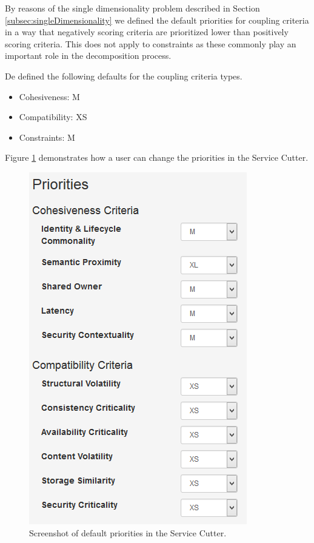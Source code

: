 \begin{minipage}[t]{0.3\textwidth}
\setlength{\parskip}{5pt plus 0.1pt}

By reasons of the single dimensionality problem described in Section \ref{subsec:singleDimensionality} we defined the default priorities for coupling criteria in a way that negatively scoring criteria are prioritized lower than positively scoring criteria. This does not apply to constraints as these commonly play an important role in the decomposition process. 

De defined the following defaults for the coupling criteria types.

\begin{itemize}
\item Cohesiveness: M
\item Compatibility: XS
\item Constraints: M
\end{itemize}

Figure \ref{fig:priorities} demonstrates how a user can change the priorities in the Service Cutter.

\end{minipage}
\begin{minipage}[t]{0.75\textwidth}
	\begin{figure}[H]
		\begin{center}
			\includegraphics[scale=0.6]{images/priorities.png}
			\caption{Screenshot of default priorities in the Service Cutter.}
			\label{fig:priorities}
		\end{center}
	\end{figure}
\end{minipage}

